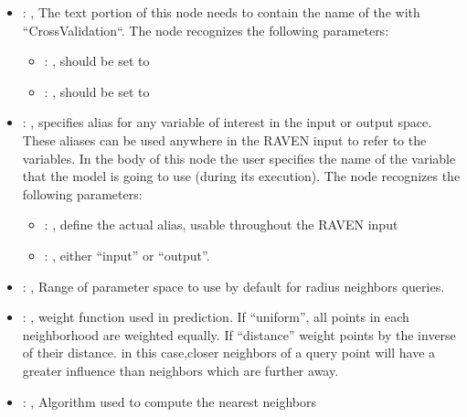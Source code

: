 \begin{itemize}
    \item {}: , 
      The text portion of this node needs to contain the name of the  with
               ``CrossValidation``.
      The  node recognizes the following parameters:
        \begin{itemize}
          \item {}: , 
            should be set to 
          \item {}: , 
            should be set to 
      \end{itemize}

    \item {}: , 
      specifies alias for         any variable of interest in the input or output space. These
      aliases can be used anywhere in the RAVEN input to         refer to the variables. In the body
      of this node the user specifies the name of the variable that the model is going to use
      (during its execution).
      The  node recognizes the following parameters:
        \begin{itemize}
          \item {}: , 
            define the actual alias, usable throughout the RAVEN input
          \item {}: , 
            either ``input'' or ``output''.
      \end{itemize}

    \item {}: , 
      Range of parameter space to use by default for radius neighbors queries.

    \item {}: , 
      weight function used in prediction. If ``uniform'', all points in each neighborhood
      are weighted equally. If ``distance'' weight points by the inverse of their distance. in this
      case,closer neighbors of a query point will have a greater influence than neighbors which are
      further away.

    \item {}: , 
      Algorithm used to compute the nearest neighbors


\end{itemize}
